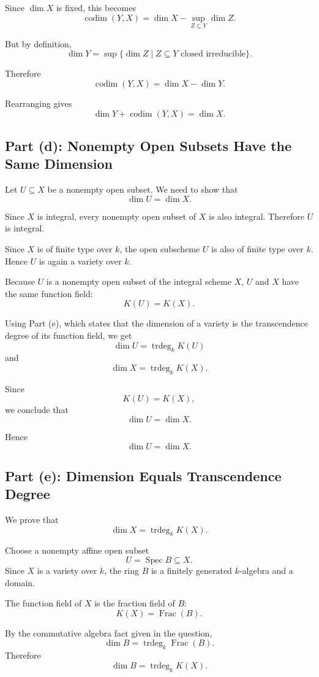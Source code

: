 \documentclass[12pt,a4paper]{article}
\DeclareMathOperator{\Spec}{Spec}
\newcommand{\Frac}{\operatorname{Frac}}
\newcommand{\codim}{\operatorname{codim}}
\newcommand{\trdeg}{\operatorname{trdeg}}
\providecommand{\Spec}{\operatorname{Spec}}
\theoremstyle{notespace}
\begin{document}
Since \(\dim X\) is fixed, this becomes
\[
\codim(Y,X)
=
\dim X-\sup_{Z\subseteq Y}\dim Z.
\]

But by definition,
\[
\dim Y
=
\sup\{\dim Z\mid Z\subseteq Y \text{ closed irreducible}\}.
\]

Therefore
\[
\codim(Y,X)=\dim X-\dim Y.
\]

Rearranging gives
\[
\boxed{\dim Y+\codim(Y,X)=\dim X.}
\]

\subsection{Part (d): Nonempty Open Subsets Have the Same Dimension}

Let \(U\subseteq X\) be a nonempty open subset. We need to show that
\[
\dim U=\dim X.
\]

Since \(X\) is integral, every nonempty open subset of \(X\) is also integral. Therefore \(U\) is integral.

Since \(X\) is of finite type over \(k\), the open subscheme \(U\) is also of finite type over \(k\). Hence \(U\) is again a variety over \(k\).

Because \(U\) is a nonempty open subset of the integral scheme \(X\), \(U\) and \(X\) have the same function field:
\[
K(U)=K(X).
\]

Using Part (e), which states that the dimension of a variety is the transcendence degree of its function field, we get
\[
\dim U=\trdeg_k K(U)
\]
and
\[
\dim X=\trdeg_k K(X).
\]

Since
\[
K(U)=K(X),
\]
we conclude that
\[
\dim U=\dim X.
\]

Hence
\[
\boxed{\dim U=\dim X.}
\]

\subsection{Part (e): Dimension Equals Transcendence Degree}

We prove that
\[
\dim X=\trdeg_k K(X).
\]

Choose a nonempty affine open subset
\[
U=\Spec B\subseteq X.
\]
Since \(X\) is a variety over \(k\), the ring \(B\) is a finitely generated \(k\)-algebra and a domain.

The function field of \(X\) is the fraction field of \(B\):
\[
K(X)=\Frac(B).
\]

By the commutative algebra fact given in the question,
\[
\dim B=\trdeg_k \Frac(B).
\]
Therefore
\[
\dim B=\trdeg_k K(X).
\]
\end{document}

